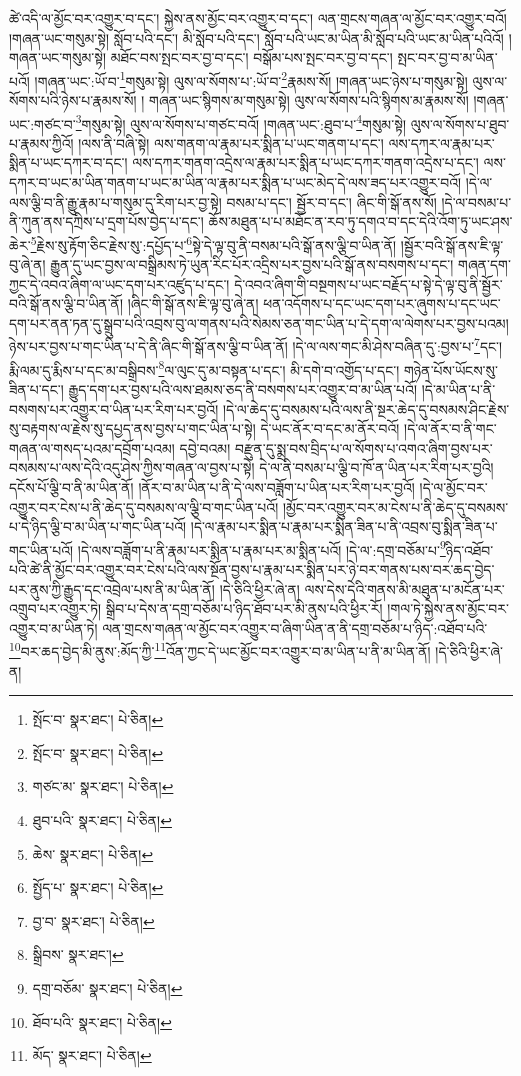 ཚེ་འདི་ལ་མྱོང་བར་འགྱུར་བ་དང་། སྐྱེས་ནས་མྱོང་བར་འགྱུར་བ་དང་། ལན་གྲངས་གཞན་ལ་མྱོང་བར་འགྱུར་བའོ། །གཞན་ཡང་གསུམ་སྟེ། སློབ་པའི་དང་། མི་སློབ་པའི་དང་། སློབ་པའི་ཡང་མ་ཡིན་མི་སློབ་པའི་ཡང་མ་ཡིན་པའིའོ། །གཞན་ཡང་གསུམ་སྟེ། མཐོང་བས་སྤང་བར་བྱ་བ་དང་། བསྒོམ་པས་སྤང་བར་བྱ་བ་དང་། སྤང་བར་བྱ་བ་མ་ཡིན་པའོ། །གཞན་ཡང་:ཡོ་བ་\footnote{སྤོང་བ་  སྣར་ཐང་།  པེ་ཅིན། }གསུམ་སྟེ། ལུས་ལ་སོགས་པ་:ཡོ་བ་\footnote{སྤོང་བ་  སྣར་ཐང་།  པེ་ཅིན། }རྣམས་སོ། །གཞན་ཡང་ཉེས་པ་གསུམ་སྟེ། ལུས་ལ་སོགས་པའི་ཉེས་པ་རྣམས་སོ། །
གཞན་ཡང་སྙིགས་མ་གསུམ་སྟེ། ལུས་ལ་སོགས་པའི་སྙིགས་མ་རྣམས་སོ། །གཞན་ཡང་:གཙང་བ་\footnote{གཙང་མ་  སྣར་ཐང་།  པེ་ཅིན། }གསུམ་སྟེ། ལུས་ལ་སོགས་པ་གཙང་བའོ། །གཞན་ཡང་:ཐུབ་པ་\footnote{ཐུབ་པའི་  སྣར་ཐང་།  པེ་ཅིན། }གསུམ་སྟེ། ལུས་ལ་སོགས་པ་ཐུབ་པ་རྣམས་ཀྱིའོ། །ལས་ནི་བཞི་སྟེ། ལས་གནག་ལ་རྣམ་པར་སྨིན་པ་ཡང་གནག་པ་དང་། ལས་དཀར་ལ་རྣམ་པར་སྨིན་པ་ཡང་དཀར་བ་དང་། ལས་དཀར་གནག་འདྲེས་ལ་རྣམ་པར་སྨིན་པ་ཡང་དཀར་གནག་འདྲེས་པ་དང་། ལས་དཀར་བ་ཡང་མ་ཡིན་གནག་པ་ཡང་མ་ཡིན་ལ་རྣམ་པར་སྨིན་པ་ཡང་མེད་དེ་ལས་ཟད་པར་འགྱུར་བའོ། །དེ་ལ་ལས་ལྕི་བ་ནི་རྒྱུ་རྣམ་པ་གསུམ་དུ་རིག་པར་བྱ་སྟེ། བསམ་པ་དང་། སྦྱོར་བ་དང་། ཞིང་གི་སྒོ་ནས་སོ། །དེ་ལ་བསམ་པ་ནི་ཀུན་ནས་དཀྲིས་པ་དྲག་པོས་བྱེད་པ་དང་། ཆོས་མཐུན་པ་པ་མཐོང་ན་རབ་ཏུ་དགའ་བ་དང་དེའི་འོག་ཏུ་ཡང་ཤས་ཆེར་\footnote{ཆེས་  སྣར་ཐང་།  པེ་ཅིན། }རྗེས་སུ་རྟོག་ཅིང་རྗེས་སུ་:དཔྱོད་པ་\footnote{སྤྱོད་པ་  སྣར་ཐང་།  པེ་ཅིན། }སྟེ་དེ་ལྟ་བུ་ནི་བསམ་པའི་སྒོ་ནས་ལྕི་བ་ཡིན་ནོ། །སྦྱོར་བའི་སྒོ་ནས་ཇི་ལྟ་བུ་ཞེ་ན། རྒྱུན་དུ་ཡང་བྱས་ལ་བསྒྲིམས་ཏེ་ཡུན་རིང་པོར་འདྲིས་པར་བྱས་པའི་སྒོ་ནས་བསགས་པ་དང་། གཞན་དག་ཀྱང་དེ་འབའ་ཞིག་ལ་ཡང་དག་པར་འཛུད་པ་དང་། དེ་འབའ་ཞིག་གི་བསྔགས་པ་ཡང་བརྗོད་པ་སྟེ་དེ་ལྟ་བུ་ནི་སྦྱོར་བའི་སྒོ་ནས་ལྕི་བ་ཡིན་ནོ། །ཞིང་གི་སྒོ་ནས་ཇི་ལྟ་བུ་ཞེ་ན། ཕན་འདོགས་པ་དང་ཡང་དག་པར་ཞུགས་པ་དང་ཡང་དག་པར་ནན་ཏན་དུ་སྒྲུབ་པའི་འབྲས་བུ་ལ་གནས་པའི་སེམས་ཅན་གང་ཡིན་པ་དེ་དག་ལ་ལེགས་པར་བྱས་པའམ། ཉེས་པར་བྱས་པ་གང་ཡིན་པ་དེ་ནི་ཞིང་གི་སྒོ་ནས་ལྕི་བ་ཡིན་ནོ། །དེ་ལ་ལས་གང་མི་ཤེས་བཞིན་དུ་:བྱས་པ་\footnote{བྱ་བ་  སྣར་ཐང་།  པེ་ཅིན། }དང་། རྨི་ལམ་དུ་རྨིས་པ་དང་མ་བསྒྲིབས་\footnote{སྒྲིབས་  སྣར་ཐང་། }ལ་ལུང་དུ་མ་བསྟན་པ་དང་། མི་དགེ་བ་འགྱོད་པ་དང་། གཉེན་པོས་ཡོངས་སུ་ཟིན་པ་དང་། རྒྱུད་དག་པར་བྱས་པའི་ལས་ཐམས་ཅད་ནི་བསགས་པར་འགྱུར་བ་མ་ཡིན་པའོ། །དེ་མ་ཡིན་པ་ནི་བསགས་པར་འགྱུར་བ་ཡིན་པར་རིག་པར་བྱའོ། །དེ་ལ་ཆེད་དུ་བསམས་པའི་ལས་ནི་སྔར་ཆེད་དུ་བསམས་ཤིང་རྗེས་སུ་བརྟགས་ལ་རྗེས་སུ་དཔྱད་ནས་བྱས་པ་གང་ཡིན་པ་སྟེ། དེ་ཡང་ནོར་བ་དང་མ་ནོར་བའོ། །དེ་ལ་ནོར་བ་ནི་གང་གཞན་ལ་གསད་པའམ་དབྲོག་པའམ། དབྱེ་བའམ། བརྫུན་དུ་སྨྲ་བས་བྲིད་པ་ལ་སོགས་པ་འགའ་ཞིག་བྱས་པར་བསམས་པ་ལས་དེའི་འདུ་ཤེས་ཀྱིས་གཞན་ལ་བྱས་པ་སྟེ། དེ་ལ་ནི་བསམ་པ་ལྕི་བ་ཁོ་ན་ཡིན་པར་རིག་པར་བྱའི། དངོས་པོ་ལྕི་བ་ནི་མ་ཡིན་ནོ། །ནོར་བ་མ་ཡིན་པ་ནི་དེ་ལས་བཟློག་པ་ཡིན་པར་རིག་པར་བྱའོ། །དེ་ལ་མྱོང་བར་འགྱུར་བར་ངེས་པ་ནི་ཆེད་དུ་བསམས་ལ་ལྕི་བ་གང་ཡིན་པའོ། །མྱོང་བར་འགྱུར་བར་མ་ངེས་པ་ནི་ཆེད་དུ་བསམས་པ་དེ་ཉིད་ལྕི་བ་མ་ཡིན་པ་གང་ཡིན་པའོ། །དེ་ལ་རྣམ་པར་སྨིན་པ་རྣམ་པར་སྨིན་ཟིན་པ་ནི་འབྲས་བུ་སྨིན་ཟིན་པ་གང་ཡིན་པའོ། །དེ་ལས་བཟློག་པ་ནི་རྣམ་པར་སྨིན་པ་རྣམ་པར་མ་སྨིན་པའོ། །དེ་ལ་:དགྲ་བཅོམ་པ་\footnote{དགྲ་བཅོམ་  སྣར་ཐང་།  པེ་ཅིན། }ཉིད་འཐོབ་པའི་ཚེ་ནི་མྱོང་བར་འགྱུར་བར་ངེས་པའི་ལས་སྔོན་བྱས་པ་རྣམ་པར་སྨིན་པར་ཉེ་བར་གནས་པས་བར་ཆད་བྱེད་པར་ནུས་ཀྱི་རྒྱུད་དང་འབྲེལ་པས་ནི་མ་ཡིན་ནོ། །དེ་ཅིའི་ཕྱིར་ཞེ་ན། ལས་དེས་དེའི་གནས་མི་མཐུན་པ་མངོན་པར་འགྲུབ་པར་འགྱུར་ཏེ། སྒྲིབ་པ་དེས་ན་དགྲ་བཅོམ་པ་ཉིད་ཐོབ་པར་མི་ནུས་པའི་ཕྱིར་རོ། །གལ་ཏེ་སྐྱེས་ནས་མྱོང་བར་འགྱུར་བ་མ་ཡིན་ཏེ། ལན་གྲངས་གཞན་ལ་མྱོང་བར་འགྱུར་བ་ཞིག་ཡིན་ན་ནི་དགྲ་བཅོམ་པ་ཉིད་:འཐོབ་པའི་\footnote{ཐོབ་པའི་  སྣར་ཐང་།  པེ་ཅིན། }བར་ཆད་བྱེད་མི་ནུས་:མོད་ཀྱི་\footnote{མོད་  སྣར་ཐང་།  པེ་ཅིན། }འོན་ཀྱང་དེ་ཡང་མྱོང་བར་འགྱུར་བ་མ་ཡིན་པ་ནི་མ་ཡིན་ནོ། །དེ་ཅིའི་ཕྱིར་ཞེ་ན། 